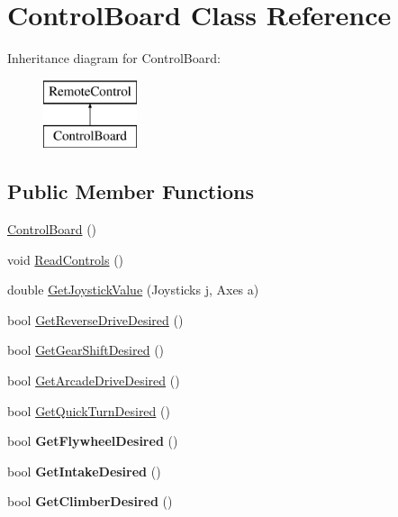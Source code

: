 \hypertarget{class_control_board}{}\section{Control\+Board Class Reference}
\label{class_control_board}
Inheritance diagram for Control\+Board\+:\begin{figure}[H]
\begin{center}
\leavevmode
\includegraphics[height=2.000000cm]{class_control_board}
\end{center}
\end{figure}
\subsection*{Public Member Functions}
\begin{DoxyCompactItemize}
\item 
\hyperlink{class_control_board_abb5d54833e99fb1b46a51e61c6f18e6e}{Control\+Board} ()
\item 
void \hyperlink{class_control_board_abc38ec1feb7a7c38adfe7ced04fc5a79}{Read\+Controls} ()
\item 
double \hyperlink{class_control_board_a82d4f6abff67ad0ba60b263d65fcc924}{Get\+Joystick\+Value} (Joysticks j, Axes a)
\item 
bool \hyperlink{class_control_board_a53f6a067fdec6785017465dba9ee2be6}{Get\+Reverse\+Drive\+Desired} ()
\item 
bool \hyperlink{class_control_board_a49f9d98f58c8f8eb8030910c27b187ed}{Get\+Gear\+Shift\+Desired} ()
\item 
bool \hyperlink{class_control_board_ab32a6888112f807dff75acbb641a3517}{Get\+Arcade\+Drive\+Desired} ()
\item 
bool \hyperlink{class_control_board_ac43151ba49812cc42028c957506a4cc4}{Get\+Quick\+Turn\+Desired} ()
\item 
\mbox{\label{class_control_board_aec381ec9f1fc6986e19c2c74a71aae48}} 
bool {\bfseries Get\+Flywheel\+Desired} ()
\item 
\mbox{\label{class_control_board_a6de85782a631c929f4deb4de8b342349}} 
bool {\bfseries Get\+Intake\+Desired} ()
\item 
\mbox{\label{class_control_board_a8e52dce04f1779134628992f860c3a3a}} 
bool {\bfseries Get\+Climber\+Desired} ()
\end{DoxyCompactItemize}
